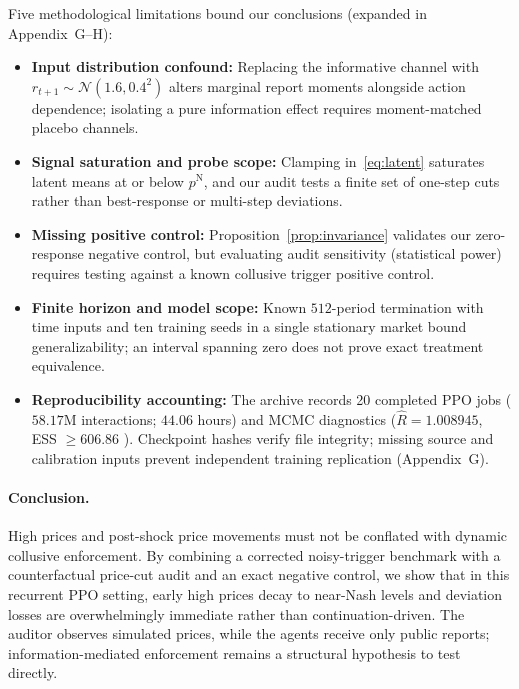 \documentclass{article}
\begin{document}
Five methodological limitations bound our conclusions (expanded in Appendix~G--H):
\begin{itemize}
\item \textbf{Input distribution confound:} Replacing the informative channel with $r_{t+1}\sim\mathcal{N}(1.6,0.4^2)$ alters marginal report moments alongside action dependence; isolating a pure information effect requires moment-matched placebo channels.
\item \textbf{Signal saturation and probe scope:} Clamping in~\eqref{eq:latent} saturates latent means at or below $p^{\mathrm{N}}$, and our audit tests a finite set of one-step cuts rather than best-response or multi-step deviations.
\item \textbf{Missing positive control:} Proposition~\ref{prop:invariance} validates our zero-response negative control, but evaluating audit sensitivity (statistical power) requires testing against a known collusive trigger positive control.
\item \textbf{Finite horizon and model scope:} Known $512$-period termination with time inputs and ten training seeds in a single stationary market bound generalizability; an interval spanning zero does not prove exact treatment equivalence.
\item \textbf{Reproducibility accounting:} The archive records 20 completed PPO jobs ($58.17$M interactions; $44.06$ hours) and MCMC diagnostics ($\hat{R}=1.008945$, ESS $\ge 606.86$ \citep{vehtari2021rank}). Checkpoint hashes verify file integrity; missing source and calibration inputs prevent independent training replication (Appendix~G).
\end{itemize}

\paragraph{Conclusion.}
High prices and post-shock price movements must not be conflated with dynamic collusive enforcement. By combining a corrected noisy-trigger benchmark with a counterfactual price-cut audit and an exact negative control, we show that in this recurrent PPO setting, early high prices decay to near-Nash levels and deviation losses are overwhelmingly immediate rather than continuation-driven. The auditor observes simulated prices, while the agents receive only public reports; information-mediated enforcement remains a structural hypothesis to test directly.
\end{document}
